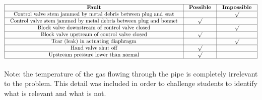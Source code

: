 $$\vbox{\offinterlineskip
\halign{\strut
\vrule \quad\hfil # \ \hfil & 
\vrule \quad\hfil # \ \hfil & 
\vrule \quad\hfil # \ \hfil \vrule \cr
\noalign{\hrule}
%
{\bf Fault} & {\bf Possible} & {\bf Impossible} \cr
%
\noalign{\hrule}
%
Control valve stem jammed by metal debris between plug and seat &  & $\surd$ \cr
%
\noalign{\hrule}
%
Control valve stem jammed by metal debris between plug and bonnet & $\surd$ &  \cr
%
\noalign{\hrule}
%
Block valve downstream of control valve closed &  & $\surd$ \cr
%
\noalign{\hrule}
%
Block valve upstream of control valve closed & $\surd$ &  \cr
%
\noalign{\hrule}
%
Tear (leak) in actuating diaphragm &  & $\surd$ \cr
%
\noalign{\hrule}
%
Hand valve shut off & $\surd$ &  \cr
%
\noalign{\hrule}
%
Upstream pressure lower than normal & $\surd$ &  \cr
%
\noalign{\hrule}
} %
}$$ %

Note: the temperature of the gas flowing through the pipe is completely irrelevant to the problem.  This detail was included in order to challenge students to identify what is relevant and what is not.




